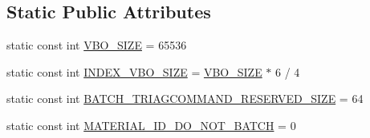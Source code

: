 \subsection*{Static Public Attributes}
\begin{DoxyCompactItemize}
\item 
static const int \hyperlink{classRenderer_adf68e0f4b14d92f2e8f357f44c52dd1d}{V\+B\+O\+\_\+\+S\+I\+ZE} = 65536
\item 
static const int \hyperlink{classRenderer_a83bd66787b385c8a009d3cd64af54057}{I\+N\+D\+E\+X\+\_\+\+V\+B\+O\+\_\+\+S\+I\+ZE} = \hyperlink{classRenderer_adf68e0f4b14d92f2e8f357f44c52dd1d}{V\+B\+O\+\_\+\+S\+I\+ZE} $\ast$ 6 / 4
\item 
static const int \hyperlink{classRenderer_a9c0c54077070dbc7cf763f90b36aacfe}{B\+A\+T\+C\+H\+\_\+\+T\+R\+I\+A\+G\+C\+O\+M\+M\+A\+N\+D\+\_\+\+R\+E\+S\+E\+R\+V\+E\+D\+\_\+\+S\+I\+ZE} = 64
\item 
static const int \hyperlink{classRenderer_a78627bb9847d4b1f2be7b8cdc3137572}{M\+A\+T\+E\+R\+I\+A\+L\+\_\+\+I\+D\+\_\+\+D\+O\+\_\+\+N\+O\+T\+\_\+\+B\+A\+T\+CH} = 0
\end{DoxyCompactItemize}
